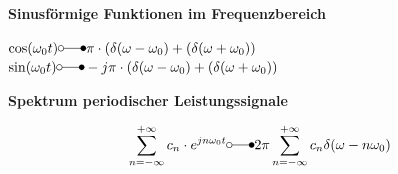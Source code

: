 	\begin{minipage}[t]{9cm}
		\textbf{Sinusf\"ormige Funktionen im Frequenzbereich}\\ 
			\hspace*{0.5cm}
			\parbox{8cm}{
				$\cos(\omega_0t) \laplace \pi \cdot (\delta(\omega - \omega_0)+ (\delta(\omega + \omega_0))$\\
				$\sin(\omega_0t) \laplace -j\pi \cdot (\delta(\omega - \omega_0)+ (\delta(\omega + \omega_0))$	
			}
	\end{minipage}
	\begin{minipage}[t]{9cm}
		\textbf{Spektrum periodischer Leistungssignale}\\ 
			\hspace*{0.5cm}
			\parbox[b][1.2cm][c]{8cm}{
				$$\sum_{n = -\infty}^{+\infty} c_n \cdot e^{jn\omega_0t} \laplace 2\pi \sum_{n = -\infty}^{+\infty} c_n\delta(\omega - n\omega_0)$$		
			}
	\end{minipage}